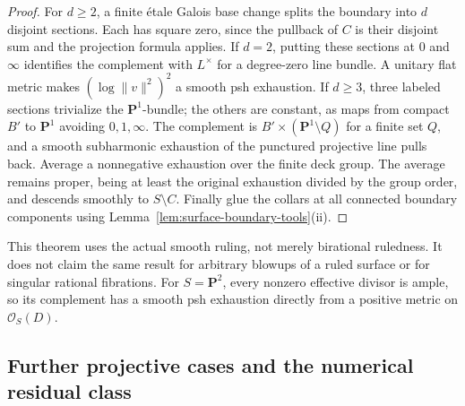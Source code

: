 \documentclass[11pt]{amsart}
\theoremstyle{definition}
\theoremstyle{remark}
\numberwithin{equation}{section}
\newcommand{\PP}{\mathbf P}
\newcommand{\OO}{\mathcal O}
\begin{document}
\begin{proof}
For $d\ge2$, a finite \'etale Galois base change splits the boundary
into $d$ disjoint sections. Each has square zero, since the pullback
of $C$ is their disjoint sum and the projection formula applies.
If $d=2$, putting these sections at $0$ and $\infty$ identifies the
complement with $L^\times$ for a degree-zero line bundle. A unitary
flat metric makes $(\log\|v\|^2)^2$ a smooth psh exhaustion.
If $d\ge3$, three labeled sections trivialize the $\PP^1$-bundle;
the others are constant, as maps from compact $B'$ to $\PP^1$
avoiding $0,1,\infty$. The complement is
$B'\times(\PP^1\setminus Q)$ for a finite set $Q$, and a smooth
subharmonic exhaustion of the punctured projective line pulls back.
Average a nonnegative exhaustion over the finite deck group. The
average remains proper, being at least the original exhaustion divided
by the group order, and descends smoothly to $S\setminus C$.
Finally glue the collars at all connected boundary components using
Lemma~\ref{lem:surface-boundary-tools}\textup{(ii)}.
\end{proof}

This theorem uses the actual smooth ruling, not merely birational
ruledness. It does not claim the same result for arbitrary blowups of
a ruled surface or for singular rational fibrations. For $S=\PP^2$,
every nonzero effective divisor is ample, so its complement has a
smooth psh exhaustion directly from a positive metric on $\OO_S(D)$.

\subsection{Further projective cases and the numerical residual class}
\label{subsec:projective-cases}
\end{document}
